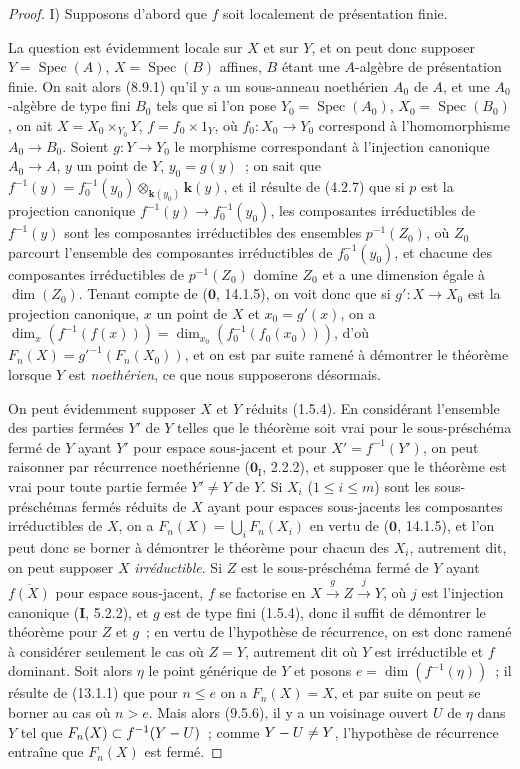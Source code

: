 \begin{proof}
I) Supposons d'abord que $f$ soit localement de présentation finie.

La question est évidemment locale sur $X$ et sur $Y$, et on peut donc supposer
$Y=\operatorname{Spec}(A)$, $X=\operatorname{Spec}(B)$ affines, $B$ étant une
$A$-algèbre de présentation finie. On sait alors (8.9.1) qu'il y a un
sous-anneau noethérien $A_0$ de $A$, et une $A_0$-algèbre de type fini $B_0$
tels que si l'on pose $Y_0=\operatorname{Spec}(A_0)$,
$X_0=\operatorname{Spec}(B_0)$, on ait $X=X_0\times_{Y_0}Y$, $f=f_0\times 1_Y$,
où $f_0:X_0\to Y_0$ correspond à l'homomorphisme $A_0\to B_0$. Soient
$g:Y\to Y_0$ le morphisme correspondant à l'injection canonique $A_0\to A$,
$y$ un point de $Y$, $y_0=g(y)$~; on sait que
$f^{-1}(y)=f_0^{-1}(y_0)\otimes_{\mathbf{k}(y_0)}\boldsymbol{k}(y)$, et il résulte de (4.2.7) que
si $p$ est la projection canonique $f^{-1}(y)\to f_0^{-1}(y_0)$, les
composantes irréductibles de $f^{-1}(y)$ sont les composantes irréductibles des
ensembles $p^{-1}(Z_0)$, où $Z_0$ parcourt l'ensemble des composantes
irréductibles de $f_0^{-1}(y_0)$, et chacune des composantes irréductibles de
$p^{-1}(Z_0)$ domine $Z_0$ et a une dimension égale à $\dim(Z_0)$. Tenant
compte de ($\mathbf 0$, 14.1.5), on voit donc que si $g':X\to X_0$ est la
projection canonique, $x$ un point de $X$ et $x_0=g'(x)$, on a
$\dim_x(f^{-1}(f(x)))=\dim_{x_0}(f_0^{-1}(f_0(x_0)))$, d'où
$F_n(X)=g'^{-1}(F_n(X_0))$, et on est par suite ramené à démontrer le théorème
lorsque $Y$ est \emph{noethérien}, ce que nous supposerons désormais.

On peut évidemment supposer $X$ et $Y$ réduits (1.5.4). En considérant
l'ensemble des parties fermées $Y'$ de $Y$ telles que le théorème soit vrai
pour le sous-préschéma fermé de $Y$ ayant $Y'$ pour espace sous-jacent et pour
$X'=f^{-1}(Y')$, on peut raisonner par récurrence noethérienne
($\mathbf 0_{\mathrm I}$, 2.2.2), et supposer que le théorème est vrai pour
toute partie fermée $Y'\neq Y$ de $Y$. Si $X_i$ ($1\leq i\leq m$) sont les
sous-préschémas fermés réduits de $X$ ayant pour espaces sous-jacents les
composantes irréductibles de $X$, on a $F_n(X)=\bigcup_iF_n(X_i)$ en vertu de
($\mathbf 0$, 14.1.5), et l'on peut donc se borner à démontrer le théorème pour
chacun des $X_i$, autrement dit, on peut supposer $X$ \emph{irréductible}. Si $Z$ est
le sous-préschéma fermé de $Y$ ayant $\overline{f(X)}$ pour espace sous-jacent,
$f$ se factorise en $X\xrightarrow{g}Z\xrightarrow{j}Y$, où $j$ est
l'injection canonique (\textbf{I}, 5.2.2), et $g$ est de type fini (1.5.4),
donc il suffit de démontrer le théorème pour $Z$ et $g$~; en vertu de
l'hypothèse de récurrence, on est donc ramené à considérer seulement le cas où
$Z=Y$, autrement dit où $Y$ est irréductible et $f$ dominant. Soit alors
$\eta$ le point générique de $Y$ et posons $e=\dim(f^{-1}(\eta))$~; il résulte
de (13.1.1) que pour $n\leq e$ on a $F_n(X)=X$, et par suite on peut se borner
au cas où $n>e$. Mais alors (9.5.6), il y a un voisinage ouvert $U$ de $\eta$
dans $Y$ tel que $F_n(X)\subset f^{-1}(Y- U)$~; comme $Y- U\neq Y$, l'hypothèse
de récurrence entraîne que $F_n(X)$ est fermé.


\end{proof}
